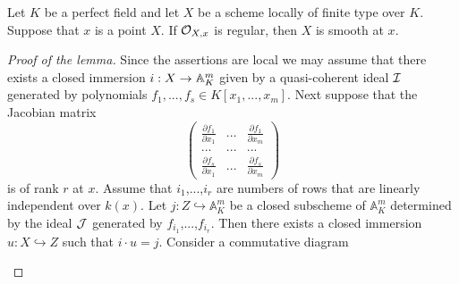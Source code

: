 \begin{lemma}\label{lemma:for_perfect_fields_regular_implies_smooth}
Let $K$ be a perfect field and let $X$ be a scheme locally of finite type over $K$. Suppose that $x$ is a point $X$. If ${\mathcal O}_{X,x}$ is regular, then $X$ is smooth at $x$.
\end{lemma}
\begin{proof}[Proof of the lemma]
Since the assertions are local we may assume that there exists a closed immersion $i:X\rightarrow \mathbb{A}^m_K$ given by a quasi-coherent ideal ${\mathcal I}$ generated by polynomials $f_1,...,f_s\in K[x_1,...,x_m]$. Next suppose that the Jacobian matrix
$$\left( \begin{array}{ccc}
\frac{\partial f_1}{\partial x_1} & ... & \frac{\partial f_1}{\partial x_{m}} \\
... &...  &...  \\
\frac{\partial f_s}{\partial x_{1}} &...  & \frac{\partial f_s}{\partial x_{m}}\end{array} \right)$$
is of rank $r$ at $x$. Assume that $i_1$,...,$i_r$ are numbers of rows that are linearly independent over $k(x)$. Let $j:Z\hookrightarrow \mathbb{A}^m_K$ be a closed subscheme of $\mathbb{A}^m_K$ determined by the ideal ${\mathcal J}$ generated by $f_{i_1}$,...,$f_{i_r}$. Then there exists a closed immersion $u:X\hookrightarrow Z$ such that $i\cdot u = j$. Consider a commutative diagram
\begin{center}
\end{center}
\end{proof}
